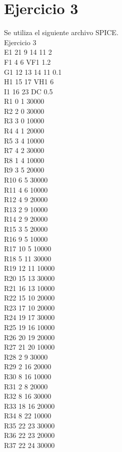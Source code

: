 \documentclass{article}
\begin{document}
\section{Ejercicio 3}
Se utiliza el siguiente archivo SPICE.\\
Ejercicio 3\\
E1 21 9 14 11 2\\
F1 4 6 VF1 1.2\\
G1 12 13 14 11 0.1\\
H1 15 17 VH1 {6}\\
I1 16 23 DC 0.5\\
R1 0 1 30000\\
R2 2 0 30000\\
R3 3 0 10000\\
R4 4 1 20000\\
R5 3 4 10000\\
R7 4 2 30000\\
R8 1 4 10000\\
R9 3 5 20000\\
R10 6 5 30000\\
R11 4 6 10000\\
R12 4 9 20000\\
R13 2 9 10000\\
R14 2 9 20000\\
R15 3 5 20000\\
R16 9 5 10000\\
R17 10 5 10000\\
R18 5 11 30000\\
R19 12 11 10000\\
R20 15 13 30000\\
R21 16 13 10000\\
R22 15 10 20000\\
R23 17 10 20000\\
R24 19 17 30000\\
R25 19 16 10000\\
R26 20 19 20000\\
R27 21 20 10000\\
R28 2 9 30000\\
R29 2 16 20000\\
R30 8 16 10000\\
R31 2 8 20000\\
R32 8 16 30000\\
R33 18 16 20000\\
R34 8 22 10000\\
R35 22 23 30000\\
R36 22 23 20000\\
R37 22 24 30000\\
\end{document}
